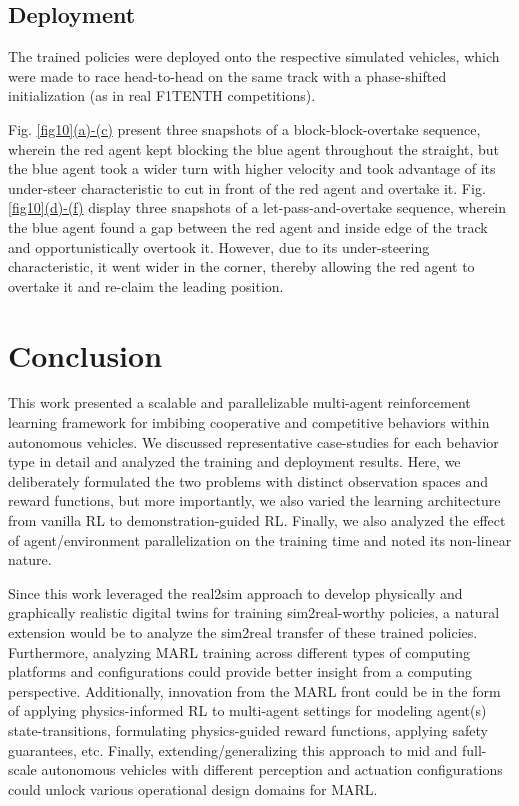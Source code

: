 \documentclass[letterpaper, 10 pt, conference]{ieeeconf}  %
\begin{document}
\subsection{Deployment}
\label{Sub-Section: Deployment II}

The trained policies were deployed onto the respective simulated vehicles, which were made to race head-to-head on the same track with a phase-shifted initialization (as in real F1TENTH competitions).

Fig. \hyperref[fig10]{\ref*{fig10}(a)-(c)} present three snapshots of a block-block-overtake sequence, wherein the red agent kept blocking the blue agent throughout the straight, but the blue agent took a wider turn with higher velocity and took advantage of its under-steer characteristic to cut in front of the red agent and overtake it. Fig. \hyperref[fig10]{\ref*{fig10}(d)-(f)} display three snapshots of a let-pass-and-overtake sequence, wherein the blue agent found a gap between the red agent and inside edge of the track and opportunistically overtook it. However, due to its under-steering characteristic, it went wider in the corner, thereby allowing the red agent to overtake it and re-claim the leading position.

\section{Conclusion}
\label{Section: Conclusion}

This work presented a scalable and parallelizable multi-agent reinforcement learning framework for imbibing cooperative and competitive behaviors within autonomous vehicles. We discussed representative case-studies for each behavior type in detail and analyzed the training and deployment results. Here, we deliberately formulated the two problems with distinct observation spaces and reward functions, but more importantly, we also varied the learning architecture from vanilla RL to demonstration-guided RL. Finally, we also analyzed the effect of agent/environment parallelization on the training time and noted its non-linear nature.

Since this work leveraged the real2sim approach to develop physically and graphically realistic digital twins for training sim2real-worthy policies, a natural extension would be to analyze the sim2real \cite{samak2023sim2real} transfer of these trained policies. Furthermore, analyzing MARL training across different types of computing platforms and configurations could provide better insight from a computing perspective. Additionally, innovation from the MARL front could be in the form of applying physics-informed RL to multi-agent settings for modeling agent(s) state-transitions, formulating physics-guided reward functions, applying safety guarantees, etc. Finally, extending/generalizing this approach to mid and full-scale autonomous vehicles with different perception and actuation configurations could unlock various operational design domains for MARL.
\end{document}
